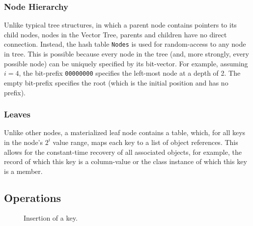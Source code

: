 \documentclass[11pt,letterpaper]{article}
\begin{document}
\subsubsection{Node Hierarchy}
Unlike typical tree structures, in which a parent node contains
pointers to its child nodes, nodes in the Vector Tree, parents and children have no
direct connection. Instead, the hash table {\tt Nodes} is used for random-access to any
node in tree.  This is possible because every node in the tree (and, more strongly,
every possible node) can be uniquely specified by its bit-vector.  For example, assuming
$i=4$, the bit-prefix {\tt 00000000} specifies the left-most node at a depth of 2.  The
empty bit-prefix specifies the root (which is the initial position and has no prefix).

\subsubsection{Leaves}
Unlike other nodes, a materialized leaf node contains a table, which, for all keys
in the node's $2^i$ value range, maps each key to a list of object references.
This allows for the constant-time recovery of all associated objects, for example,
the record of which this key is a column-value or the class instance of which this
key is a member.




\subsection{Operations}

\begin{figure}[t]
	\center
\caption{Insertion of a key.}
\label{fig:insertion-diagram}
\end{figure}
\end{document}
